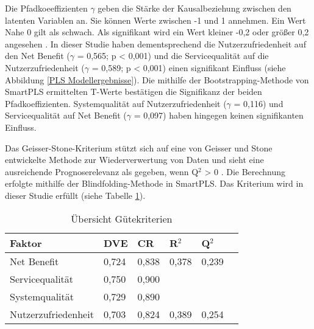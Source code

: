 Die Pfadkoeeffizienten $\gamma$ geben die Stärke der Kausalbeziehung zwischen den latenten Variablen an. Sie können Werte zwischen -1 und 1 annehmen. Ein Wert Nahe 0 gilt als schwach. Als signifikant wird ein Wert kleiner -0,2 oder größer 0,2 angesehen \parencite[vgl.][S.11]{chin1998commentary}. In dieser Studie haben dementsprechend die Nutzerzufriedenheit auf den Net Benefit ($\gamma$ = 0,565; p < 0,001) und die Servicequalität auf die Nutzerzufriedenheit ($\gamma$ = 0,589; p < 0,001) einen signifikant Einfluss (siehe Abbildung \ref{PLS Modellergebnisse}). Die mithilfe der Bootstrapping-Methode von SmartPLS ermittelten T-Werte bestätigen die Signifikanz der beiden Pfadkoeffizienten. Systemqualität auf Nutzerzufriedenheit ($\gamma$ = 0,116) und Servicequalität auf Net Benefit ($\gamma$ = 0,097) haben hingegen keinen signifikanten Einfluss. 

\nocite{geisser1974predictive}

Das Geisser-Stone-Kriterium stützt sich auf eine von Geisser und Stone entwickelte Methode zur Wiederverwertung von Daten und sieht eine ausreichende Prognoserelevanz als gegeben, wenn Q$^2$ > 0 \parencite[vgl.][S.35]{nitzl2010anwenderorientierte}. Die Berechnung erfolgte mithilfe der Blindfolding-Methode in SmartPLS. Das Kriterium wird in dieser Studie erfüllt (siehe Tabelle \ref{tab:Übersicht Gütekriterien}).
 

\begin{table}[h] 
\footnotesize
\caption{Übersicht Gütekriterien}
\label{tab:Übersicht Gütekriterien} 
\begin{tabular}{@{}llllll@{}} \toprule

\textbf{Faktor} & \textbf{DVE} & \textbf{CR} & \textbf{R$^2$} & \textbf{Q$^2$} \\ \midrule

 Net Benefit 		& 0,724 		& 0,838 		& 0,378 		& 0,239 		 \\
 
 Servicequalität 	& 0,750 		& 0,900 		& 			& 			 \\

 Systemqualität 	& 0,729 		& 0,890 		& 			& 			 \\

 Nutzerzufriedenheit & 0,703 	& 0,824 		& 0,389 		& 0,254		 \\ \bottomrule
\end{tabular}	
\end{table}



